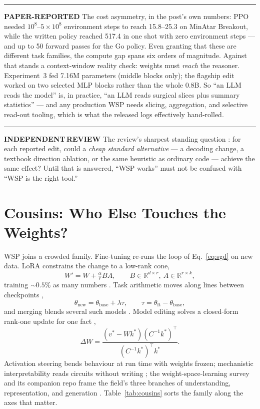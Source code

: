 \documentclass[11pt,a4paper]{article}
\newcommand{\bP}{\textcolor{wspblue}{\rule[0.12ex]{1.5mm}{1.5mm}}\;\textcolor{wspblue}{\textbf{PAPER-REPORTED}}}
\newcommand{\bR}{\textcolor{wspgreen}{\rule[0.12ex]{1.5mm}{1.5mm}}\;\textcolor{wspgreen}{\textbf{INDEPENDENT\,REVIEW}}}
\begin{document}
\bP\; The cost asymmetry, in the post's own numbers: PPO needed $10^8$--$5{\times}10^8$ environment steps to reach 15.8--25.3 on MinAtar Breakout, while the written policy reached 517.4 in one shot with zero environment steps --- and up to 50 forward passes for the Go policy. Even granting that these are different task families, the compute gap spans six orders of magnitude. Against that stands a context-window reality check: weights must \emph{reach} the reasoner. Experiment~3 fed 7.16M parameters (middle blocks only); the flagship edit worked on two selected MLP blocks rather than the whole 0.8B. So ``an LLM reads the model'' is, in practice, ``an LLM reads surgical slices plus summary statistics'' --- and any production WSP needs slicing, aggregation, and selective read-out tooling, which is what the released logs effectively hand-rolled.

\bR\; The review's sharpest standing question \cite{maier}: for each reported edit, could a \emph{cheap standard alternative} --- a decoding change, a textbook direction ablation, or the same heuristic as ordinary code --- achieve the same effect? Until that is answered, ``WSP works'' must not be confused with ``WSP is the right tool.''

\section{Cousins: Who Else Touches the Weights?}\label{sec:cousins}

WSP joins a crowded family. Fine-tuning re-runs the loop of Eq.~\eqref{eq:sgd} on new data. LoRA constrains the change to a low-rank cone,
\begin{equation}\label{eq:lora}
W' = W + \tfrac{\alpha}{r}BA, \qquad B \in \mathbb{R}^{d\times r},\ A \in \mathbb{R}^{r\times k},
\end{equation}
training ${\sim}0.5\%$ as many numbers \cite{lora}. Task arithmetic moves along lines between checkpoints \cite{ilharco},
\begin{equation}\label{eq:taskarith}
\theta_{\text{new}} = \theta_{\text{base}} + \lambda \tau, \qquad \tau = \theta_{\text{ft}} - \theta_{\text{base}},
\end{equation}
and merging blends several such models \cite{ties}. Model editing solves a closed-form rank-one update for one fact \cite{rome},
\begin{equation}\label{eq:rome}
\Delta W = \frac{(v^{*} - Wk^{*})(C^{-1}k^{*})^{\top}}{(C^{-1}k^{*})^{\top} k^{*}}.
\end{equation}
Activation steering bends behaviour at run time with weights frozen; mechanistic interpretability reads circuits without writing \cite{elhage,olsson,nanda}; the weight-space-learning survey and its companion repo frame the field's three branches of understanding, representation, and generation \cite{wslsurvey,awesomewsl}. Table~\ref{tab:cousins} sorts the family along the axes that matter.
\end{document}
